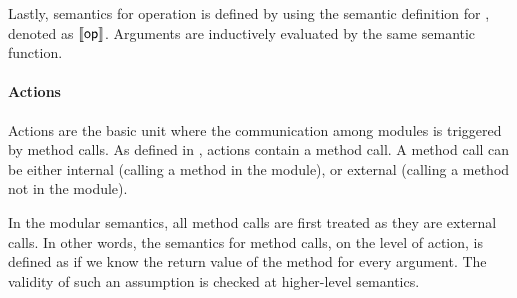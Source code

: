 Lastly, semantics for operation is defined by using the semantic
definition for \seop{}, denoted as $\llbracket \textsf{op}{} \rrbracket$. Arguments are
inductively evaluated by the same semantic function.

\paragraph{Actions}

Actions are the basic unit where the communication among modules is
triggered by method calls. As defined in , actions
contain a method call. A method call can be either internal (calling a
method in the module), or external (calling a method not in the
module).

In the modular semantics, all method calls are first treated as they
are external calls. In other words, the semantics for method calls, on
the level of action, is defined as if we know the return value of the
method for every argument. The validity of such an assumption is
checked at higher-level semantics.

